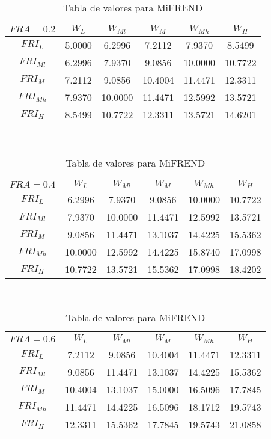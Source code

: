     
    
       \begin{table}[h]
    	\caption{Tabla de valores para MiFREND} \label{tab:betas1} 
    	\centering
    \footnotesize 
    	\begin{tabular}{|c||c|c|c|c|c|}
    		\hline
    		$FRA=0.2$	 &$W_L$&$W_{Ml}$&$W_M$&$W_{Mh}$&$W_H$\\
    		\hline  
    		\hline  
    		$FRI_L$&	 5.0000 &   6.2996 &   7.2112 & 7.9370 &  8.5499\\
    		
    		$FRI_{Ml}$&	6.2996  &  7.9370 &   9.0856 &  10.0000  & 10.7722\\
    		
    		$FRI_M$&	7.2112 &   9.0856 &  10.4004 &  11.4471 &  12.3311\\
    		
    		$FRI_{Mh}$&	7.9370 &  10.0000 &  11.4471 &  12.5992 &  13.5721\\
    		
    		$FRI_H$&	8.5499  & 10.7722 &  12.3311 &  13.5721 &  14.6201\\
    		\hline 
    	\end{tabular} \\
    	\bigskip
    	
    	
    	\begin{tabular}{|c||c|c|c|c|c|}
    		\hline
	   		$FRA=0.4$	 &$W_L$&$W_{Ml}$&$W_M$&$W_{Mh}$&$W_H$\\
    		\hline  
    		\hline  
    		$FRI_L$&6.2996&    7.9370  &  9.0856   &10.0000 &  10.7722\\
    		$FRI_{Ml}$&7.9370  & 10.0000 &  11.4471 &  12.5992 &  13.5721\\
    		$FRI_M$&9.0856  & 11.4471  & 13.1037 &  14.4225  & 15.5362\\
    		$FRI_{Mh}$&10.0000 &  12.5992  & 14.4225&   15.8740  & 17.0998\\
    		$FRI_H$&10.7722 &  13.5721  & 15.5362&   17.0998  & 18.4202\\
    		\hline 
    	\end{tabular} 
    	\bigskip
    	\\
    	
    	
    	\begin{tabular}{|c||c|c|c|c|c|}
    		\hline
    		$FRA=0.6$	 &$W_L$&$W_{Ml}$&$W_M$&$W_{Mh}$&$W_H$\\
    		\hline  
    		\hline  
    		$FRI_L$&	7.2112 &   9.0856 &  10.4004 &  11.4471 &  12.3311\\
    		$FRI_{Ml}$&	9.0856  & 11.4471 & 13.1037 &  14.4225  & 15.5362\\
    		$FRI_M$&	10.4004  & 13.1037 &  15.0000 &  16.5096 &  17.7845\\
    		$FRI_{Mh}$&	11.4471  & 14.4225 &  16.5096 &  18.1712 &  19.5743\\
    		$FRI_H$&	12.3311  & 15.5362 &  17.7845 &  19.5743 &  21.0858\\
    		\hline 
    	\end{tabular} \bigskip
    	\\
    	

\end{table}
